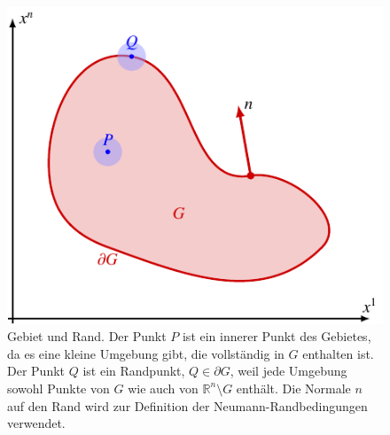 %
%
%
\begin{figure}
\centering
\includegraphics{chapters/080-feldgleichungen/images/gebiet.pdf}
\caption{Gebiet und Rand.
Der Punkt $P$ ist ein innerer Punkt des Gebietes, da es eine kleine
Umgebung gibt, die vollständig in $G$ enthalten ist.
Der Punkt $Q$ ist ein Randpunkt, $Q\in\partial G$, weil jede Umgebung
sowohl Punkte von $G$ wie auch von $\mathbb{R}^n\setminus G$ enthält.
Die Normale $n$ auf den Rand wird zur Definition der Neumann-Randbedingungen
verwendet.
\label{buch:feldgleichungen:loesungsverfahren:fig:gebiet}}
\end{figure}
